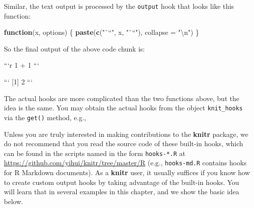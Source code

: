 \documentclass[
  11pt,
]{krantz}
\newenvironment{Shaded}{\begin{snugshade}}{\end{snugshade}}
\newcommand{\BaseNTok}[1]{\textcolor[rgb]{0.06,0.06,0.06}{#1}}
\newcommand{\CharTok}[1]{\textcolor[rgb]{0.5,0.5,0.5}{#1}}
\newcommand{\CommentTok}[1]{\textcolor[rgb]{0.37,0.37,0.37}{\textit{#1}}}
\newcommand{\ControlFlowTok}[1]{\textcolor[rgb]{0.27,0.27,0.27}{\textbf{#1}}}
\newcommand{\DataTypeTok}[1]{\textcolor[rgb]{0.27,0.27,0.27}{#1}}
\newcommand{\KeywordTok}[1]{\textcolor[rgb]{0.27,0.27,0.27}{\textbf{#1}}}
\newcommand{\NormalTok}[1]{#1}
\newcommand{\OperatorTok}[1]{\textcolor[rgb]{0.43,0.43,0.43}{\textbf{#1}}}
\newcommand{\StringTok}[1]{\textcolor[rgb]{0.5,0.5,0.5}{#1}}
\begin{document}
Similar, the text output is processed by the \texttt{output} hook that looks like this function:

\begin{Shaded}
\begin{Highlighting}[]
\ControlFlowTok{function}\NormalTok{(x, options) \{}
  \KeywordTok{paste}\NormalTok{(}\KeywordTok{c}\NormalTok{(}\StringTok{"```"}\NormalTok{, x, }\StringTok{"```"}\NormalTok{), }\DataTypeTok{collapse =} \StringTok{"}\CharTok{\textbackslash{}n}\StringTok{"}\NormalTok{)}
\NormalTok{\}}
\end{Highlighting}
\end{Shaded}

So the final output of the above code chunk is:

\begin{Shaded}
\begin{Highlighting}[]
\BaseNTok{```r}
\BaseNTok{1 + 1}
\BaseNTok{```}

\BaseNTok{```}
\BaseNTok{[1] 2}
\BaseNTok{```}
\end{Highlighting}
\end{Shaded}

The actual hooks are more complicated than the two functions above, but the idea is the same. You may obtain the actual hooks from the object \texttt{knit\_hooks} via the \texttt{get()} method, e.g.,

\begin{Shaded}
\end{Shaded}

Unless you are truly interested in making contributions to the \textbf{knitr} package, we do not recommend that you read the source code of these built-in hooks, which can be found in the scripts named in the form \texttt{hooks-*.R} at \url{https://github.com/yihui/knitr/tree/master/R} (e.g., \texttt{hooks-md.R} contains hooks for R Markdown documents). As a \textbf{knitr} user, it usually suffices if you know how to create custom output hooks by taking advantage of the built-in hooks. You will learn that in several examples in this chapter, and we show the basic idea below.
\end{document}
